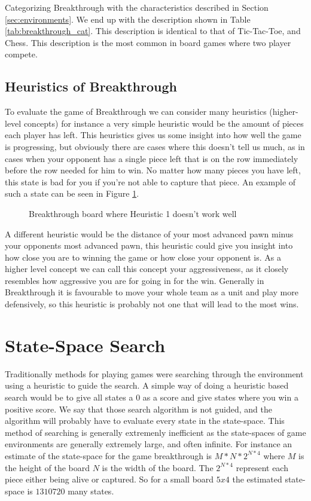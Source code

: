 Categorizing Breakthrough with the characteristics described in Section \ref{sec:environments}. We end up with the description 
shown in Table \ref{tab:breakthrough_cat}. This description is identical to that of Tic-Tac-Toe, and Chess.
This description is the most common in board games where two player compete. 

\subsection{Heuristics of Breakthrough}

To evaluate the game of Breakthrough we can consider many heuristics (higher-level concepts) for instance 
a very simple heuristic would be the amount of pieces each player has left. This heuristics gives us some 
insight into how well the game is progressing, but obviously there are cases where this doesn't tell us 
much, as in cases when your opponent has a single piece left that is on the row immediately before the 
row needed for him to win. No matter how many pieces you have left, this state is bad for you if you're not 
able to capture that piece. An example of such a state can be seen in Figure \ref{fig:bt_h1_bad}.

\begin{figure}[]
  \centering
  \caption{Breakthrough board where Heuristic 1 doesn't work well}
  \label{fig:bt_h1_bad}
\end{figure}


A different heuristic would be the distance of your most advanced pawn minus your opponents most 
advanced pawn, this heuristic could give you insight into how close you are to winning the game or 
how close your opponent is. As a higher level concept we can call this concept your aggressiveness, 
as it closely resembles how aggressive you are for going in for the win. Generally in Breakthrough 
it is favourable to move your whole team as a unit and play more defensively, so this heuristic 
is probably not one that will lead to the most wins.

\section{State-Space Search}

Traditionally methods for playing games were searching through the environment using a heuristic to
guide the search. A simple way of doing a heuristic based search would be to give all states a $0$ 
as a score and give states where you win a positive score. We say that those search algorithm 
is not guided, and the algorithm will probably have to evaluate every state in the state-space. 
This method of searching is generally extremenly inefficient as the state-spaces of game environments 
are generally extremely large, and often infinite. For instance an estimate of the state-space 
for the game breakthrough is $M * N * 2^{N*4}$ where $M$ is the height of the board $N$ is the width 
of the board. The $2^{N*4}$ represent each piece either being alive or captured. So for a small board
$5x4$ the estimated state-space is $1310720$ many states.

